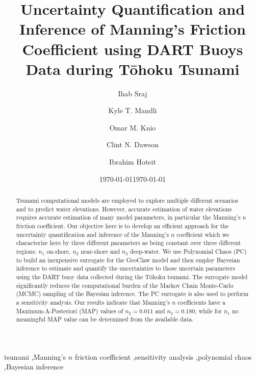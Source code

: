 \documentclass[preprint,12pt]{elsarticle}
\newcommand{\geoclaw}{{\sc GeoClaw}\xspace}
\newcommand{\tohoku}{T\={o}hoku\xspace}
\begin{document}
\ifpdf
{}
\else
{}
\fi

\begin{frontmatter}

\title{Uncertainty Quantification and Inference of Manning's Friction Coefficient using DART Buoys Data during
\tohoku Tsunami}
\date{\today}

\author[kaust]{Ihab Sraj}
\author[ut]{Kyle T. Mandli}
\author[duke]{Omar M. Knio}
\author[ut]{Clint N. Dawson}
\author[kaust]{Ibrahim Hoteit}
\address[kaust]{Department of Physical Sciences and Engineering, King Abdullah University for Science and Technology, Thuwal, Saudi Arabia}
\address[ut]{Institute for Computational Engineering and Science, University of Texas at Austin, 201 E 24th ST. Stop C0200, Austin, TX 78712-1229, USA}
\address[duke]{Department of Mechanical Engineering and Materials Science, Duke University, 144
Hudson Hall, Durham, North Carolina 27708, USA}
\date{\today}

\begin{abstract}

Tsunami computational models are employed to explore multiple  different
scenarios and to predict water elevations.  However, accurate estimation of
water elevations  requires accurate estimation of many model parameters, in
particular the Manning's $n$ friction coefficient.  Our objective here is to
develop an efficient approach for the  uncertainty quantification and inference
of the Manning's $n$ coefficient  which we characterize here by three different
parameters  as being constant over three different regions: $n_1$ on-shore,
$n_2$ near-shore and $n_3$ deep-water.  We use Polynomial Chaos (PC) to build an
inexpensive surrogate for the  \geoclaw model and then employ Bayesian inference
to estimate  and quantify the uncertainties to those uncertain parameters using
the DART buoy data collected during the \tohoku tsunami.  The surrogate model
significantly reduces the computational burden of the Markov Chain Monte-Carlo
(MCMC)  sampling of the Bayesian inference. The PC surrogate is also used to
perform a sensitivity analysis.  Our results indicate that Manning's $n$
coefficients have a Maximum-A-Posteriori (MAP) values of $n_2=0.011$ and
$n_3=0.180$, while for $n_1$ no meaningful MAP value can be determined from the
available data.

\end{abstract}

\begin{keyword}
tsunami \sep Manning's $n$ friction coefficient \sep sensitivity analysis \sep polynomial chaos \sep Bayesian inference
\end{keyword}

\end{frontmatter}
\linenumbers
\end{document}
